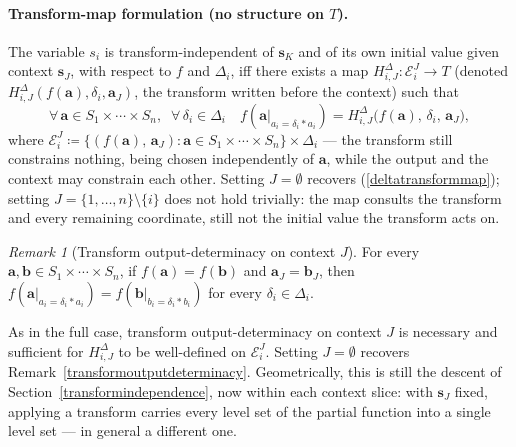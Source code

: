 \documentclass{article}
\theoremstyle{definition}
\theoremstyle{remark}
\newtheorem{remark}[proposition]{Remark}
\begin{document}
\paragraph{Transform-map formulation (no structure on $T$).} The variable $s_i$ is transform-independent of $\boldsymbol{s}_K$ and of its own initial value given context $\boldsymbol{s}_J$, with respect to $f$ and $\Delta_i$, iff there exists a map $H_{i,J}^\Delta \colon \mathcal{E}_i^J \to T$ (denoted $H_{i,J}^\Delta(f(\boldsymbol{a}), \delta_i, \boldsymbol{a}_J)$, the transform written before the context) such that
\begin{equation}
\label{contextdeltatransformmap}
\forall\, \boldsymbol{a} \in S_1 \times \cdots \times S_n,\;\; \forall\, \delta_i \in \Delta_i \quad
f(\boldsymbol{a}|_{a_i = \delta_i \ast a_i}) = H_{i,J}^\Delta\bigl(f(\boldsymbol{a}),\, \delta_i,\, \boldsymbol{a}_J\bigr),
\end{equation}
where $\mathcal{E}_i^J \coloneqq \{(f(\boldsymbol{a}),\, \boldsymbol{a}_J) : \boldsymbol{a} \in S_1 \times \cdots \times S_n\} \times \Delta_i$ --- the transform still constrains nothing, being chosen independently of $\boldsymbol{a}$, while the output and the context may constrain each other. Setting $J = \emptyset$ recovers (\ref{deltatransformmap}); setting $J = \{1, \ldots, n\} \setminus \{i\}$ does not hold trivially: the map consults the transform and every remaining coordinate, still not the initial value the transform acts on.

\begin{remark}[Transform output-determinacy on context $J$]
\label{contexttransformoutputdeterminacy}
For every $\boldsymbol{a}, \boldsymbol{b} \in S_1 \times \cdots \times S_n$, if $f(\boldsymbol{a}) = f(\boldsymbol{b})$ and $\boldsymbol{a}_J = \boldsymbol{b}_J$, then $f(\boldsymbol{a}|_{a_i = \delta_i \ast a_i}) = f(\boldsymbol{b}|_{b_i = \delta_i \ast b_i})$ for every $\delta_i \in \Delta_i$.
\end{remark}

\noindent As in the full case, transform output-determinacy on context $J$ is necessary and sufficient for $H_{i,J}^\Delta$ to be well-defined on $\mathcal{E}_i^J$. Setting $J = \emptyset$ recovers Remark~\ref{transformoutputdeterminacy}. Geometrically, this is still the descent of Section~\ref{transformindependence}, now within each context slice: with $\boldsymbol{s}_J$ fixed, applying a transform carries every level set of the partial function into a single level set --- in general a different one.
\end{document}
